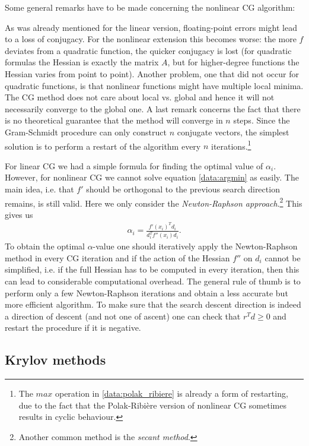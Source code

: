     Some general remarks have to be made concerning the nonlinear CG algorithm:
    \begin{remark}
        As was already mentioned for the linear version, floating-point errors might lead to a loss of conjugacy. For the nonlinear extension this becomes worse: the more $f$ deviates from a quadratic function, the quicker conjugacy is lost (for quadratic formulas the Hessian is exactly the matrix $A$, but for higher-degree functions the Hessian varies from point to point). Another problem, one that did not occur for quadratic functions, is that nonlinear functions might have multiple local minima. The CG method does not care about local vs. global and hence it will not necessarily converge to the global one. A last remark concerns the fact that there is no theoretical guarantee that the method will converge in $n$ steps. Since the Gram-Schmidt procedure can only construct $n$ conjugate vectors, the simplest solution is to perform a restart of the algorithm every $n$ iterations.\footnote{The $max$ operation in \eqref{data:polak_ribiere} is already a form of restarting, due to the fact that the Polak-Ribi\`ere version of nonlinear CG sometimes results in cyclic behaviour.}
    \end{remark}

    For linear CG we had a simple formula for finding the optimal value of $\alpha_i$. However, for nonlinear CG we cannot solve equation \ref{data:argmin} as easily. The main idea, i.e. that $f'$ should be orthogonal to the previous search direction remains, is still valid. Here we only consider the \textit{Newton-Raphson approach}.\footnote{Another common method is the \textit{secant method}.} This gives us
    \begin{gather}
        \alpha_i = \frac{f'(x_i)^Td_i}{d_i^Tf''(x_i)d_i}.
    \end{gather}
    To obtain the optimal $\alpha$-value one should iteratively apply the Newton-Raphson method in every CG iteration and if the action of the Hessian $f''$ on $d_i$ cannot be simplified, i.e. if the full Hessian has to be computed in every iteration, then this can lead to considerable computational overhead. The general rule of thumb is to perform only a few Newton-Raphson iterations and obtain a less accurate but more efficient algorithm. To make sure that the search descent direction is indeed a direction of descent (and not one of ascent) one can check that $r^Td\geq0$ and restart the procedure if it is negative.

\subsection{Krylov methods}

